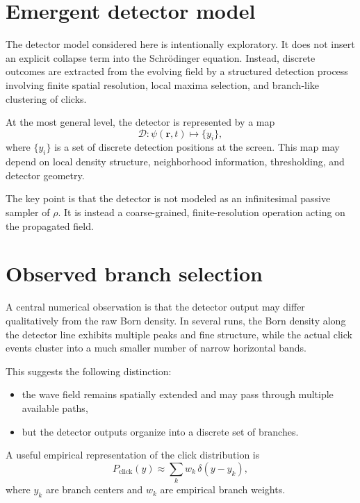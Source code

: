 \documentclass[aps,prl,reprint]{revtex4-2}
\begin{document}
\section{Emergent detector model}

The detector model considered here is intentionally exploratory. It does not
insert an explicit collapse term into the Schr\"odinger equation. Instead,
discrete outcomes are extracted from the evolving field by a structured
detection process involving finite spatial resolution, local maxima selection,
and branch-like clustering of clicks.

At the most general level, the detector is represented by a map
\begin{equation}
\mathcal D : \psi(\mathbf r,t) \mapsto \{ y_i \},
\end{equation}
where $\{y_i\}$ is a set of discrete detection positions at the screen.
This map may depend on local density structure, neighborhood information,
thresholding, and detector geometry.

The key point is that the detector is not modeled as an infinitesimal passive
sampler of $\rho$. It is instead a coarse-grained, finite-resolution operation
acting on the propagated field.

\section{Observed branch selection}

A central numerical observation is that the detector output may differ
qualitatively from the raw Born density. In several runs, the Born density
along the detector line exhibits multiple peaks and fine structure, while the
actual click events cluster into a much smaller number of narrow horizontal
bands.

This suggests the following distinction:
\begin{itemize}
\item the wave field remains spatially extended and may pass through multiple
available paths,
\item but the detector outputs organize into a discrete set of branches.
\end{itemize}

A useful empirical representation of the click distribution is
\begin{equation}
P_{\mathrm{click}}(y) \approx \sum_{k} w_k \, \delta(y-y_k),
\end{equation}
where $y_k$ are branch centers and $w_k$ are empirical branch weights.
\end{document}

